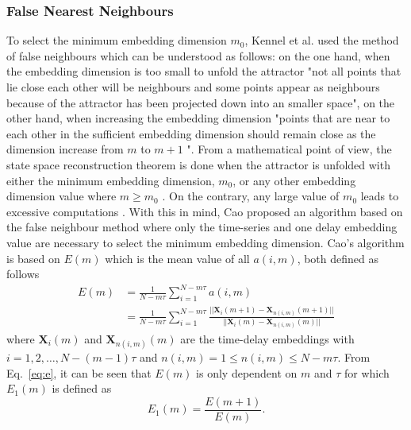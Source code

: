 \documentclass[fleqn,10pt]{wlscirep}
\begin{document}
\subsubsection*{False Nearest Neighbours}
To select the minimum embedding dimension $m_0$, Kennel et al. \cite{kennel1992} used the method of false neighbours which can be understood as follows:
on the one hand, when the embedding dimension is too small to unfold the attractor "not all points that lie close each other will be neighbours and some points appear as neighbours because of the attractor has been projected down into an smaller space", on the other hand, when increasing the embedding dimension "points that are near to each other in the sufficient embedding dimension should remain close as the dimension increase from $m$ to $m+1$ \cite{krakovska2015}".
From a mathematical point of view, the state space reconstruction theorem is done when the attractor is unfolded with either the minimum embedding dimension, $m_0$, or any other embedding dimension value where $m \ge m_0$ \cite{kennel1992}. On the contrary, any large value of $m_0$ leads to excessive computations \cite{bradley2015}.
With this in mind, Cao \cite{Cao1997} proposed an algorithm based on the false neighbour method where only the time-series and one delay embedding value are necessary to select the minimum embedding dimension.
Cao's algorithm is based on $E(m)$  which is the mean value of all $a(i,m)$, both defined as follows
\begin{equation}\label{eq:e}
  \begin{aligned}
	E(m) &= \frac{1}{N-m\tau} \sum_{i=1}^{N-m\tau} a(i,m) \\
	 &=
       \frac{1}{N-m\tau} \sum_{i=1}^{N-m\tau}
       \frac{ || \boldsymbol{X}_i(m+1) - \boldsymbol{X}_{n(i,m)}(m+1) || }
            { || \boldsymbol{X}_i(m) - \boldsymbol{X}_{n(i,m)}(m) ||  }
  \end{aligned}
\end{equation}
where $\boldsymbol{X}_i(m)$ and $\boldsymbol{X}_{n(i,m)}(m)$ are the time-delay embeddings with $i=1,2,\dots,N-(m-1)\tau$ and $ n(i,m)= 1 \le n(i,m) \le N-m\tau$.
From Eq.~\ref{eq:e}, it can be seen that $E(m)$ is only dependent on $m$ and $\tau$ for which $E_1(m)$ is defined as
\begin{equation}\label{eq:e1}
E_1(m) = \frac{ E(m+1) } { E(m)}.
\end{equation}
\end{document}
